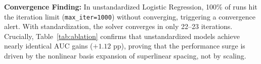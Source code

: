 \documentclass[10pt,a4paper]{article}
\begin{document}
\textbf{Convergence Finding:} In unstandardized Logistic Regression, 100\% of runs hit the iteration limit (\texttt{max\_iter=1000}) without converging, triggering a convergence alert. With standardization, the solver converges in only 22--23 iterations. Crucially, Table~\ref{tab:ablation} confirms that unstandardized models achieve nearly identical AUC gains ($+1.12$ pp), proving that the performance surge is driven by the nonlinear basis expansion of superlinear spacing, not by scaling.
\end{document}
